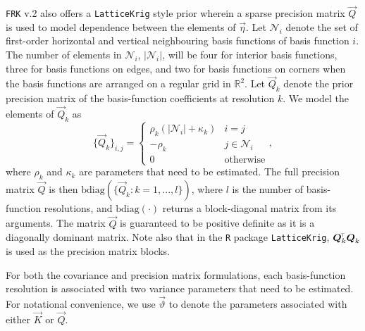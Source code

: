 \documentclass[12pt,a4paper]{article}
\begin{document}
\texttt{FRK} v.2 also offers a \texttt{LatticeKrig} \citep{Nychka_2016_LatticeKrig}  style prior wherein a sparse precision matrix $\vec{Q}$ is used to model dependence between the elements of $\vec{\eta}$. 
Let $\mathcal{N}_i$ denote the set of first-order horizontal and vertical neighbouring basis functions of basis function $i$. 
The number of elements in $\mathcal{N}_i$, $|\mathcal{N}_i|$, will be four for interior basis functions, three for basis functions on edges, and two for basis functions on corners when the basis functions are arranged on a regular grid in $\mathbb{R}^2$.
Let $\vec{Q}_k$ denote the prior precision matrix of the basis-function coefficients at resolution $k$. 
We model the elements of $\vec{Q}_k$ as
\begin{equation}\label{eqn:Q_k}
    \{\vec{Q}_k\}_{i, j}
=
\begin{cases}
\rho_k (|\mathcal{N}_i| + \kappa_k)   & i = j\\
-\rho_k & j \in \mathcal{N}_i \\
0 & \text{otherwise}
\end{cases},
\end{equation}
where $\rho_k$ and $\kappa_k$ are parameters that need to be estimated. 
The full precision matrix $\vec{Q}$ is then $\text{bdiag}(\{\vec{Q}_k: k = 1,...,l\})$, where $l$ is the number of basis-function resolutions, and $\text{bdiag}(\cdot)$ returns a block-diagonal matrix from its arguments. 
The matrix $\vec{Q}$ is guaranteed to be positive definite as it is a diagonally dominant matrix. 
Note also that in the \texttt{R} package \texttt{LatticeKrig}, $\vec{Q}_k^\tp\vec{Q}_k$ is used as the precision matrix blocks. 

For both the covariance and precision matrix formulations, each basis-function resolution is associated with two variance parameters that need to be estimated.
For notational convenience, we use $\vec{\vartheta}$ to denote the parameters associated with either $\vec{K}$ or $\vec{Q}$. 
\end{document}
